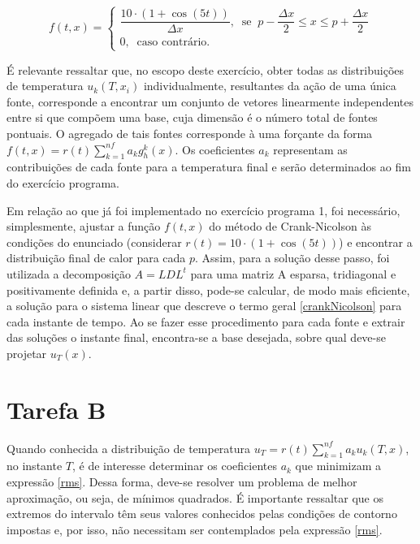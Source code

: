 \documentclass[12pt]{article}
\begin{document}
\begin{spacing}{1.5}
\begin{equation}\label{fonte_pontual}
f(t,x) =\begin{cases}
     \dfrac{10\cdot(1 + \cos(5t))}{\Delta x},\;\; \text{se} \;\; p-\dfrac{\Delta x}{2} \leq x \leq p + \dfrac{\Delta x}{2} \\
    0,\;\; \text{caso contrário.}
\end{cases}
\end{equation}

\clearpage
É relevante ressaltar que, no escopo deste exercício, obter todas as distribuições de temperatura  $u_k(T,x_i)$ individualmente, resultantes da ação de uma única fonte, corresponde a encontrar um conjunto de vetores linearmente independentes entre si que compõem uma base, cuja dimensão é o número total de fontes pontuais. O agregado de tais fontes corresponde à uma forçante da forma $f(t,x) = r(t)\sum_{k=1}^{n f}{a_kg^k_h(x)}$. Os coeficientes $a_k$ representam as contribuições de cada fonte para a temperatura final e serão determinados ao fim do exercício programa.

Em relação ao que já foi implementado no exercício programa 1, foi necessário, simplesmente, ajustar a função $f(t,x)$ do método de Crank-Nicolson às condições do enunciado (considerar $r(t) = 10\cdot(1+\cos(5t))$) e encontrar a distribuição final de calor para cada $p$.
Assim, para a solução desse passo, foi utilizada a decomposição $A=LDL^{t}$ para uma matriz A esparsa, tridiagonal e positivamente definida e, a partir disso, pode-se calcular, de modo mais eficiente, a solução para o sistema linear que descreve o termo geral \eqref{crankNicolson} para cada instante de tempo. Ao se fazer esse procedimento para cada fonte e extrair das soluções o instante final, encontra-se a base desejada, sobre qual deve-se projetar $u_T(x)$. 

\section{Tarefa B}

Quando conhecida a distribuição de temperatura $u_T = r(t)\sum_{k=1}^{n f}{a_k u_k(T, x)}$, no instante $T$, é de interesse determinar os coeficientes $a_k$ que minimizam a expressão \eqref{rms}. Dessa forma, deve-se resolver um problema de melhor aproximação, ou seja, de mínimos quadrados. É importante ressaltar que os extremos do intervalo têm seus valores conhecidos pelas condições de contorno impostas e, por isso, não necessitam ser contemplados pela expressão \eqref{rms}.


\end{spacing}
\end{document}
